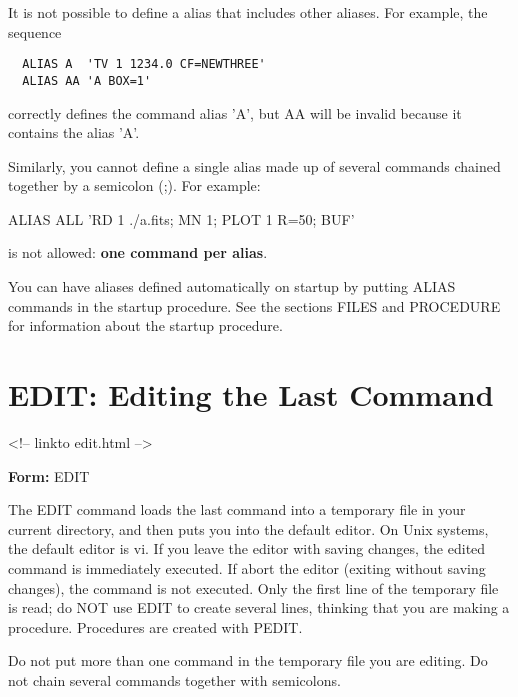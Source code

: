 It is not possible to define a alias that includes other aliases.  For
example, the sequence
\begin{verbatim}
  ALIAS A  'TV 1 1234.0 CF=NEWTHREE'
  ALIAS AA 'A BOX=1'
\end{verbatim}
correctly defines the command alias 'A', but AA will be invalid because it
contains the alias 'A'.

Similarly, you cannot define a single alias made up of several commands
chained together by a semicolon (;).  For example:
\begin{hanging}
  \item{ALIAS ALL 'RD 1 ./a.fits; MN 1; PLOT 1 R=50; BUF'}
\end{hanging}
is not allowed: \textbf{one command per alias}.

You can have aliases defined automatically on startup by putting ALIAS
commands in the startup procedure.  See the sections FILES and PROCEDURE
for information about the startup procedure.

\section{EDIT: Editing the Last Command}
\begin{rawhtml}
<!-- linkto edit.html -->
\end{rawhtml}


\begin{command}
  \item[\textbf{Form: }EDIT\hfill]{}
\end{command}

The EDIT command loads the last command into a temporary file in your
current directory, and then puts you into the default editor.  On Unix
systems, the default editor is vi.  If you leave the editor with saving
changes, the edited command is immediately executed.  If abort the editor
(exiting without saving changes), the command is not executed. Only the
first line of the temporary file is read; do NOT use EDIT to create several
lines, thinking that you are making a procedure.  Procedures are created
with PEDIT.

Do not put more than one command in the temporary file you are editing.  Do
not chain several commands together with semicolons.

